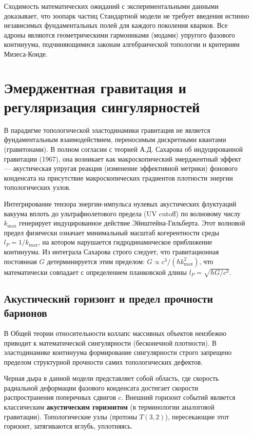 \documentclass[12pt,a4paper]{article}
\begin{document}
	Сходимость математических ожиданий с экспериментальными данными доказывает, что зоопарк частиц Стандартной модели не требует введения истинно независимых фундаментальных полей для каждого поколения кварков. Все адроны являются геометрическими гармониками (модами) упругого фазового континуума, подчиняющимися законам алгебраической топологии и критериям Мизеса-Коиде.
	
	\section{Эмерджентная гравитация и регуляризация сингулярностей}
	
	В парадигме топологической эластодинамики гравитация не является фундаментальным взаимодействием, переносимым дискретными квантами (гравитонами). В полном согласии с теорией А.Д. Сахарова об индуцированной гравитации (1967), она возникает как макроскопический эмерджентный эффект — акустическая упругая реакция (изменение эффективной метрики) фонового конденсата на присутствие макроскопических градиентов плотности энергии топологических узлов.
	
	Интегрирование тензора энергии-импульса нулевых акустических флуктуаций вакуума вплоть до ультрафиолетового предела (UV cutoff) по волновому числу $k_{\text{max}}$ генерирует индуцированное действие Эйнштейна-Гильберта. Этот волновой предел физически означает минимальный масштаб когерентности среды $l_P = 1/k_{\text{max}}$, на котором нарушается гидродинамическое приближение континуума. Из интеграла Сахарова строго следует, что гравитационная постоянная $G$ детерминируется этим пределом: $G \propto c^3 / (\hbar k_{\text{max}}^2)$, что математически совпадает с определением планковской длины $l_P = \sqrt{\hbar G / c^3}$.
	
	\subsection{Акустический горизонт и предел прочности барионов}
	В Общей теории относительности коллапс массивных объектов неизбежно приводит к математической сингулярности (бесконечной плотности). В эластодинамике континуума формирование сингулярности строго запрещено пределом структурной прочности самих топологических дефектов.
	
	Черная дыра в данной модели представляет собой область, где скорость радиальной деформации фазового конденсата достигает скорости распространения поперечных сдвигов $c$. Внешний горизонт событий является классическим \textbf{акустическим горизонтом} (в терминологии аналоговой гравитации). Топологические узлы (протоны $T(3,2)$), пересекающие этот горизонт, затягиваются вглубь, уплотняясь.
	
\end{document}
